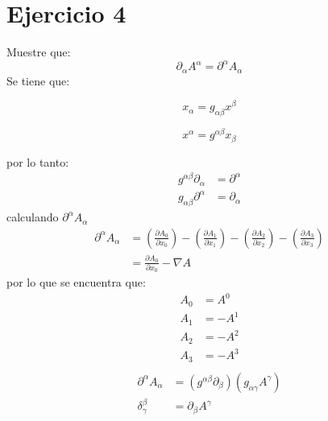 \section*{Ejercicio 4}
Muestre que:
    \begin{equation*}
        \partial_\alpha A^\alpha = \partial^\alpha A_\alpha 
    \end{equation*}
    Se tiene que:\\
    \begin{minipage}{0.5\linewidth}
        \begin{equation*}
            x_\alpha = g_{\alpha \beta} x^\beta 
        \end{equation*}
    \end{minipage}
    \begin{minipage}{0.5\linewidth}
        \begin{equation*}
            x^\alpha = g^{\alpha \beta}x_\beta
        \end{equation*}
    \end{minipage}
    por lo tanto: 
    \begin{align*}
        g^{\alpha \beta}\partial_\alpha &= \partial^\alpha \\
        g_{\alpha \beta}\partial^\alpha &= \partial_\alpha 
    \end{align*}
    calculando $\partial^\alpha A_\alpha$
    \begin{align*}
        \partial^\alpha A_\alpha &= \left(\frac{\partial A_0}{\partial x_0} \right)-\left(\frac{\partial A_1}{\partial x_1} \right)-\left(\frac{\partial A_2}{\partial x_2} \right)-\left(\frac{\partial A_3}{\partial x_3}\right)\\
        & = \frac{\partial A_0}{\partial x_0} - \nabla A
    \end{align*}
    por lo que se encuentra que:
    \begin{align*}
        A_0&=A^0 \\ A_1&=-A^1 \\ A_2&=-A^2 \\ A_3&=-A^3 \\
    \end{align*}
    \begin{align*}
        \partial^\alpha A_\alpha &= (g^{\alpha \beta}\partial_\beta)(g_{\alpha \gamma}A^\gamma)\\
        \delta^\beta_\gamma &= \partial_\beta A^\gamma
    \end{align*}